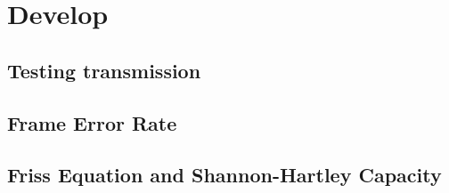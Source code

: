 \section{Develop}


\subsection{Testing transmission}
\subsection{Frame Error Rate}
\subsection{Friss Equation and Shannon-Hartley Capacity}
